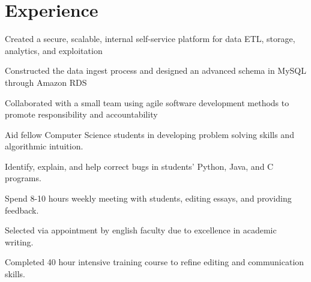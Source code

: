 \documentclass{resume}
\begin{document}
\hfill
\begin{minipage}[t]{0.66\textwidth}


\section{Experience}

\vspace{1.25\topsep} %
\begin{tightemize}
\item Created a secure, scalable, internal self-service platform for data ETL, storage, analytics, and exploitation
\item Constructed the data ingest process and designed an advanced schema in MySQL through Amazon RDS
\item Collaborated with a small team using agile software development methods to promote responsibility and accountability
\end{tightemize}
\sectionsep


\begin{tightemize}
\item Aid fellow Computer Science students in developing problem solving skills and algorithmic intuition.
\item Identify, explain, and help correct bugs in students’ Python, Java, and C programs.
\end{tightemize}
\sectionsep

\begin{tightemize}
\item Spend 8-10 hours weekly meeting with students, editing essays, and providing feedback. 
\item Selected via appointment by english faculty due to excellence in academic writing.
\item Completed 40 hour intensive training course to refine editing  and communication skills.
\end{tightemize}
\sectionsep



\end{minipage}
\end{document}
